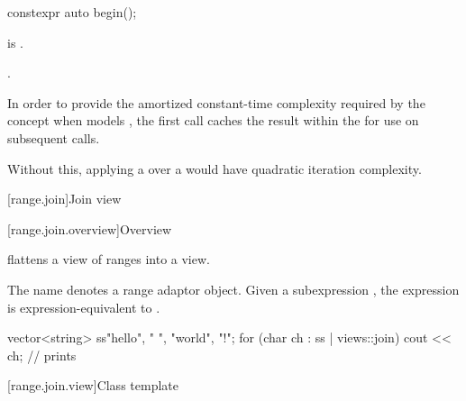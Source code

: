 %
\begin{itemdecl}
constexpr auto begin();
\end{itemdecl}

\begin{itemdescr}
\pnum
\expects
{} is .

\pnum
\returns
{}.

\pnum
\remarks
In order to provide the amortized constant-time complexity
required by the  concept
when  models ,
the first call caches the result within the 
for use on subsequent calls.
\begin{note}
Without this,
applying a  over a 
would have quadratic iteration complexity.
\end{note}
\end{itemdescr}

[range.join]{Join view}

[range.join.overview]{Overview}

\pnum
{} flattens a view of ranges into a view.

\pnum
{}%
The name  denotes a
range adaptor object.
Given a subexpression , the expression
 is expression-equivalent to
.

\pnum
\begin{example}
\begin{codeblock}
vector<string> ss{"hello", " ", "world", "!"};
for (char ch : ss | views::join)
  cout << ch;                                   // prints 
\end{codeblock}
\end{example}

[range.join.view]{Class template }

